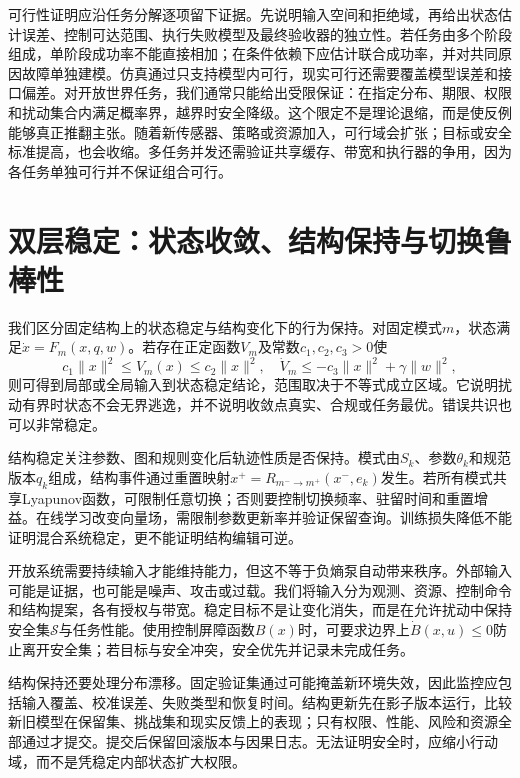 可行性证明应沿任务分解逐项留下证据。先说明输入空间和拒绝域，再给出状态估计误差、控制可达范围、执行失败模型及最终验收器的独立性。若任务由多个阶段组成，单阶段成功率不能直接相加；在条件依赖下应估计联合成功率，并对共同原因故障单独建模。仿真通过只支持模型内可行，现实可行还需要覆盖模型误差和接口偏差。对开放世界任务，我们通常只能给出受限保证：在指定分布、期限、权限和扰动集合内满足概率界，越界时安全降级。这个限定不是理论退缩，而是使反例能够真正推翻主张。随着新传感器、策略或资源加入，可行域会扩张；目标或安全标准提高，也会收缩。多任务并发还需验证共享缓存、带宽和执行器的争用，因为各任务单独可行并不保证组合可行。

\section{双层稳定：状态收敛、结构保持与切换鲁棒性}
\label{sec:section_825}

我们区分固定结构上的状态稳定与结构变化下的行为保持。对固定模式$m$，状态满足$\dot x=F_m(x,q,w)$。若存在正定函数$V_m$及常数$c_1,c_2,c_3>0$使
\begin{equation}
c_1\|x\|^2\le V_m(x)\le c_2\|x\|^2,\quad \dot V_m\le-c_3\|x\|^2+\gamma\|w\|^2,
\end{equation}
则可得到局部或全局输入到状态稳定结论，范围取决于不等式成立区域。它说明扰动有界时状态不会无界逃逸，并不说明收敛点真实、合规或任务最优。错误共识也可以非常稳定。

结构稳定关注参数、图和规则变化后轨迹性质是否保持。模式由$S_k$、参数$\theta_k$和规范版本$q_k$组成，结构事件通过重置映射$x^+=R_{m^-\to m^+}(x^-,e_k)$发生。若所有模式共享Lyapunov函数，可限制任意切换；否则要控制切换频率、驻留时间和重置增益。在线学习改变向量场，需限制参数更新率并验证保留查询。训练损失降低不能证明混合系统稳定，更不能证明结构编辑可逆。

开放系统需要持续输入才能维持能力，但这不等于负熵泵自动带来秩序。外部输入可能是证据，也可能是噪声、攻击或过载。我们将输入分为观测、资源、控制命令和结构提案，各有授权与带宽。稳定目标不是让变化消失，而是在允许扰动中保持安全集$\mathcal S$与任务性能。使用控制屏障函数$B(x)$时，可要求边界上$\dot B(x,u)\le0$防止离开安全集；若目标与安全冲突，安全优先并记录未完成任务。

结构保持还要处理分布漂移。固定验证集通过可能掩盖新环境失效，因此监控应包括输入覆盖、校准误差、失败类型和恢复时间。结构更新先在影子版本运行，比较新旧模型在保留集、挑战集和现实反馈上的表现；只有权限、性能、风险和资源全部通过才提交。提交后保留回滚版本与因果日志。无法证明安全时，应缩小行动域，而不是凭稳定内部状态扩大权限。

